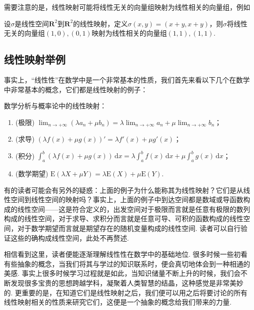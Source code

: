 需要注意的是，线性映射可能将线性无关的向量组映射为线性相关的向量组，例如
\begin{example}{}{}
    设$\sigma$是线性空间$\mathbf{R}^2$到$\mathbf{R}^2$的线性映射，定义$\sigma(x,y)=(x+y,x+y)$，则$\sigma$将线性无关的向量组$(1,0),(0,1)$映射为线性相关的向量组$(1,1),(1,1)$.
\end{example}

\subsection{线性映射举例}

事实上，``线性性''在数学中是一个非常基本的性质，我们首先来看以下几个在数学中非常基本的概念，它们都是线性映射的例子：
\begin{example}{}{}
    数学分析与概率论中的线性映射：
    \begin{enumerate}
        \item (极限) $\displaystyle\lim_{n\to +\infty}(\lambda a_n+\mu b_n)=\lambda\lim_{n\to +\infty}a_n+\mu\displaystyle\lim_{n\to +\infty}b_n$；

        \item (求导) $(\lambda f(x)+\mu g(x))'=\lambda f'(x)+\mu g'(x)$；

        \item (积分) $\displaystyle\int_a^b(\lambda f(x)+\mu g(x))\,\mathrm{d}x=\lambda\int_a^bf(x)\,\mathrm{d}x+\mu\displaystyle\int_a^bg(x)\,\mathrm{d}x$；

        \item (数学期望) $\mathrm{E}(\lambda X+\mu Y)=\lambda \mathrm{E}(X)+\mu \mathrm{E}(Y)$.
    \end{enumerate}
\end{example}

有的读者可能会有另外的疑惑：上面的例子为什么能称其为线性映射？它们是从线性空间到线性空间的映射吗？事实上，上面的例子中到达空间都是数域或导函数构成的线性空间——这是符合定义的，出发空间对于极限而言就是任意有极限的数列构成的线性空间，对于求导、求积分而言就是任意可导、可积的函数构成的线性空间，对于数学期望而言就是期望存在的随机变量构成的线性空间. 读者可以自行验证这些的确构成线性空间，此处不再赘述.

相信看到这里，读者便能逐渐理解线性性在数学中的基础地位. 很多时候一些初看有些抽象的概念，当我们将其与学过的知识联系时，便会真切地体会到一种相通的美感. 事实上很多时候学习过程就是如此，当知识储量不断上升的时候，我们会不断发现很多宝贵的思想跨越学科，凝聚着人类智慧的结晶，这种感觉是非常美妙的. 更重要的是，在知道它们是线性映射之后，我们便可以用之后将要讨论的所有线性映射相关的性质来研究它们，这便是一个抽象的概念给我们带来的力量.

